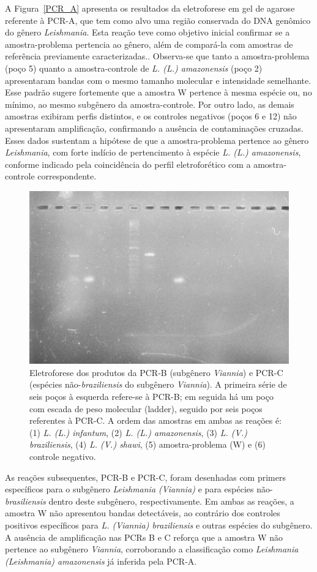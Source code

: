 A Figura~\ref{PCR_A} apresenta os resultados da eletroforese em gel de agarose referente à PCR-A, que tem como alvo uma região conservada do DNA genômico do gênero
 \textit{Leishmania}. Esta reação teve como objetivo inicial confirmar se a amostra-problema pertencia ao gênero, além de compará-la com amostras de referência previamente 
 caracterizadas.. Observa-se que tanto a amostra-problema (poço 5) quanto a amostra-controle de \textit{L. (L.) amazonensis} (poço 2) apresentaram bandas com o mesmo tamanho 
 molecular e intensidade semelhante. Esse padrão sugere fortemente que a amostra W pertence à mesma espécie ou, no mínimo, ao mesmo subgênero da amostra-controle. Por outro 
 lado, as demais amostras  exibiram perfis distintos, e os controles negativos (poços 6 e 12) não apresentaram amplificação, confirmando a ausência de contaminações cruzadas.
Esses dados sustentam a hipótese de que a amostra-problema pertence ao gênero \textit{Leishmania}, com forte indício de pertencimento à espécie \textit{L. (L.) amazonensis}, 
conforme indicado pela coincidência do perfil eletroforético com a amostra-controle correspondente.

\begin{figure}
 \centering
 \includegraphics[width=.4\textwidth]{fig/pcrBeC_g8.jpg}
 \caption{Eletroforese dos produtos da PCR-B (subgênero \textit{Viannia}) e PCR-C (espécies não-\textit{braziliensis} do subgênero \textit{Viannia}). 
 A primeira série de seis poços à esquerda refere-se à PCR-B; em seguida há um poço com escada de peso molecular (ladder), seguido por seis poços referentes 
 à PCR-C. A ordem das amostras em ambas as reações é: (1) \textit{L. (L.) infantum}, (2) \textit{L. (L.) amazonensis}, (3) \textit{L. (V.) braziliensis}, 
 (4) \textit{L. (V.) shawi}, (5) amostra-problema (W) e (6) controle negativo.}
 \label{pcrBC}
 \end{figure}

As reações subsequentes, PCR-B e PCR-C, foram desenhadas com primers específicos para o subgênero \textit{Leishmania (Viannia)} e para espécies não-\textit{brasiliensis} dentro 
deste subgênero, respectivamente. Em ambas as reações, a amostra W não apresentou bandas detectáveis, ao contrário dos controles positivos específicos para \textit{L. (Viannia) 
braziliensis} e outras espécies do subgênero. A ausência de amplificação nas PCRs B e C reforça que a amostra W não pertence ao subgênero \textit{Viannia}, corroborando a classificação 
como \textit{Leishmania (Leishmania) amazonensis} já inferida pela PCR-A.

